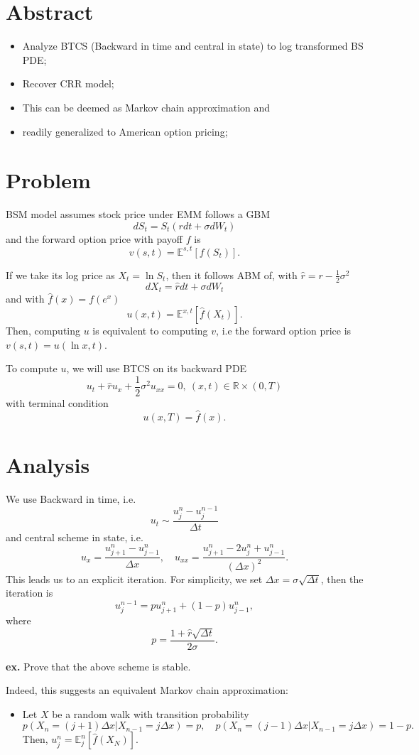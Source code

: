 \documentclass{article}
\begin{document}
\section{Abstract}
\begin{itemize}
 \item Analyze BTCS (Backward in time and central in state) to 
 log transformed BS PDE;
 \item Recover CRR model;
 \item This can be deemed as Markov chain approximation and 
 \item readily generalized to American option pricing;
\end{itemize}

\section{Problem}
BSM model assumes stock price under EMM follows a GBM
$$d S_{t} = S_{t} (r dt + \sigma dW_{t})$$
and the forward option price with payoff $f$ is 
$$v(s, t) = \mathbb E^{s,t} [f(S_{t})].$$

If we take its log price as $X_{t} = \ln S_{t}$, then it follows ABM of,
with $\hat r = r - \frac 1 2 \sigma^{2}$
$$d X_{t} = \hat r dt + \sigma dW_{t}$$
and with $\hat f(x) = f(e^{x})$
$$u(x, t) = \mathbb E^{x,t}[ \hat f(X_{t}) ].$$
Then, computing $u$ is equivalent to computing $v$, i.e 
the forward option price is $v(s, t) = u(\ln x, t)$.

To compute $u$, we will use BTCS on its backward PDE
$$u_{t} + \hat r u_{x} + \frac 1 2 \sigma^{2} u_{xx} = 0, 
\ (x, t) \in \mathbb R\times (0, T)$$
with terminal condition
$$u(x, T) = \hat f(x).$$

\section{Analysis}

We use Backward in time, i.e.
$$u_{t} \sim \frac{u_{j}^{n} - u_{j}^{n-1}}{\Delta t}$$
and central scheme in state, i.e.
$$u_{x} = \frac{u_{j+1}^{n} - u_{j-1}^{n}}{\Delta x}, \quad
u_{xx} = \frac{u_{j+1}^{n} - 2 u_{j}^{n} + u_{j-1}^{n}}{(\Delta x)^{2}}.$$
This leads us to an explicit iteration. For simplicity, we set $\Delta x = \sigma \sqrt{\Delta t}$, then
the iteration is
$$u_{j}^{n-1} = p u_{j+1}^{n} + (1-p) u_{j-1}^{n},$$
where
$$p = \frac{1+ \hat r \sqrt{\Delta t}}{2\sigma}.$$

{\bf ex. } 
Prove that the above scheme is stable.


Indeed, this suggests an equivalent Markov chain approximation:
\begin{itemize}
 \item Let $X$ be a random walk with transition probability
 $$p(X_{n} = (j+1)\Delta x | X_{n-1} = j \Delta x) = p, 
 \quad 
 p(X_{n} = (j-1)\Delta x | X_{n-1} = j \Delta x) = 1-p.
 $$
 Then, $u_{j}^{n} = \mathbb E_{j}^{n} [\hat f(X_{N})].$
\end{itemize}
\end{document}
